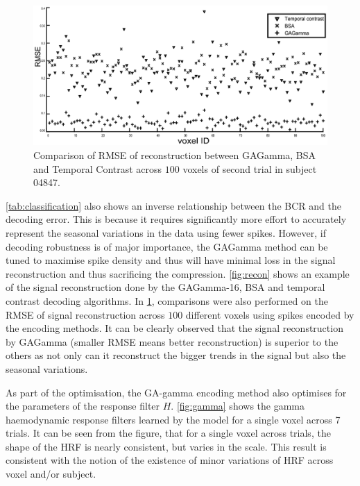 \begin{figure}
	\centering
	\includegraphics[width=\linewidth]{fig/encoding/recon.eps}
	\caption{Comparison of RMSE of reconstruction between GAGamma, BSA and Temporal Contrast across $100$ voxels of second trial in subject 04847.}
	\label{fig:RMSE}
\end{figure} 

\tablename \ref{tab:classification} also shows an inverse relationship between the BCR and the decoding error. This is because it requires significantly more effort to accurately represent the seasonal variations in the data using fewer spikes. However, if decoding robustness is of major importance, the GAGamma method can be tuned to maximise spike density and thus will have minimal loss in the signal reconstruction and thus sacrificing the compression. \figurename \ref{fig:recon} shows an example of the signal reconstruction done by the GAGamma-16, BSA and temporal contrast decoding algorithms. In \figurename \ref{fig:RMSE}, comparisons were also performed on the RMSE of signal reconstruction across $100$ different voxels using spikes encoded by the encoding methods. It can be clearly observed that the signal reconstruction by GAGamma (smaller RMSE means better reconstruction) is superior to the others as not only can it reconstruct the bigger trends in the signal but also the seasonal variations.

As part of the optimisation, the GA-gamma encoding method also optimises for the parameters of the response filter $H$. \figurename \ref{fig:gamma} shows the gamma haemodynamic response filters learned by the model for a single voxel across 7 trials. It can be seen from the figure, that for a single voxel across trials, the shape of the HRF is nearly consistent, but varies in the scale. This result is consistent with the notion of the existence of minor variations of HRF across voxel and/or subject.

